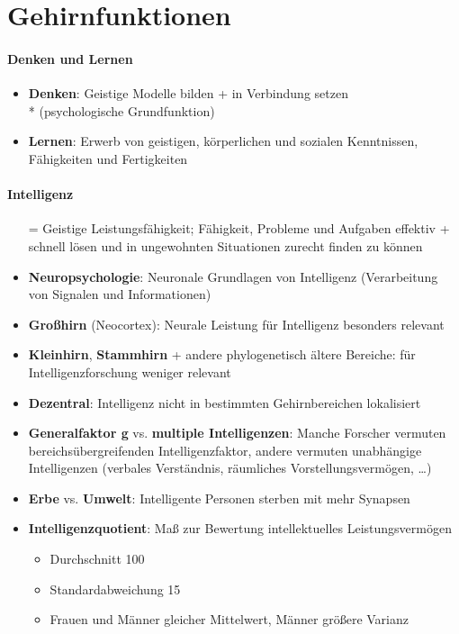 \section*{Gehirnfunktionen}

\paragraph{Denken und Lernen}
\begin{itemize}
  \item \textbf{Denken}: Geistige Modelle bilden + in Verbindung setzen \\* (psychologische Grundfunktion)
  \item \textbf{Lernen}: Erwerb von geistigen, körperlichen und sozialen Kenntnissen, Fähigkeiten und Fertigkeiten
\end{itemize}

\paragraph{Intelligenz}
\begin{itemize}
  \item[=] Geistige Leistungsfähigkeit; Fähigkeit, Probleme und Aufgaben effektiv + schnell lösen und in ungewohnten Situationen zurecht finden zu können
  \item \textbf{Neuropsychologie}: Neuronale Grundlagen von Intelligenz (Verarbeitung von Signalen und Informationen)
  \item \textbf{Großhirn} (Neocortex): Neurale Leistung für Intelligenz besonders relevant
  \item \textbf{Kleinhirn}, \textbf{Stammhirn} + andere phylogenetisch ältere Bereiche: für Intelligenzforschung weniger relevant
  \item \textbf{Dezentral}: Intelligenz nicht in bestimmten Gehirnbereichen lokalisiert
  \item \textbf{Generalfaktor g} vs. \textbf{multiple Intelligenzen}: Manche Forscher vermuten bereichsübergreifenden Intelligenzfaktor, andere vermuten unabhängige Intelligenzen (verbales Verständnis, räumliches Vorstellungsvermögen, \dots)
  \item \textbf{Erbe} vs. \textbf{Umwelt}: Intelligente Personen sterben mit mehr Synapsen
  \item \textbf{Intelligenzquotient}: Maß zur Bewertung intellektuelles Leistungsvermögen
  \begin{itemize}
    \item Durchschnitt 100
    \item Standardabweichung 15
    \item Frauen und Männer gleicher Mittelwert, Männer größere Varianz
  \end{itemize}
\end{itemize}

